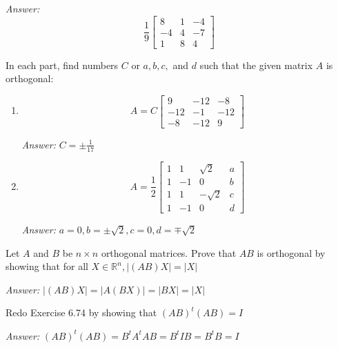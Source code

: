 \documentclass[letterpaper]{article}
\newcommand{\ans}{\textit{Answer: }}
\newenvironment{question}[2][Question]{\begin{trivlist}
\item[\hskip \labelsep {\bfseries #1}\hskip \labelsep {\bfseries #2.}]}{\end{trivlist}}
\begin{document}
\begin{question}{6.70}
\begin{enumerate}[label=(\alph*)]
    \ans 
    $$
    \frac{1}{9} \left[ \begin{array}{rrr}{8} & {1} & {-4} \\ {-4} & {4} & {-7} \\ {1} & {8} & {4}\end{array}\right]
    $$

  \end{enumerate}

\end{question}

\begin{question}{6.71}
  In each part, find numbers $C$ or $a, b, c,$ and $d$ such that the given matrix $A$ is
  orthogonal:

  \begin{enumerate}
    \item 
    $$
    A=C \left[ \begin{array}{ccc}{9} & {-12} & {-8} \\ {-12} & {-1} & {-12} \\ {-8} & {-12} & {9}\end{array}\right]
    $$

    \ans $C = \pm \frac{1}{17}$

    \item
    $$
    A=\frac{1}{2} \left[ \begin{array}{rrrr}{1} & {1} & {\sqrt{2}} & {a} \\ {1} & {-1} & {0} & {b} \\ {1} & {1} & {-\sqrt{2}} & {c} \\ {1} & {-1} & {0} & {d}\end{array}\right]
    $$

    \ans $a = 0, b = \pm \sqrt{2}, c = 0, d = \mp \sqrt{2}$ 
  \end{enumerate}  

\end{question}

\begin{question}{6.74}
  Let $A$ and $B$ be $n \times n$ orthogonal matrices. Prove that $A B$ is orthogonal by
  showing that for all $X \in \mathbb{R}^{n},|(A B) X|=|X|$

  \ans $|(A B) X| = |A (B X)| = |B X| = |X|$
\end{question}

\begin{question}{6.75}
  Redo Exercise 6.74 by showing that $(A B)^{t}(A B)=I$

  \ans $(A B)^{t}(A B) = B^tA^tAB = B^tIB = B^tB = I$
\end{question}
\end{document}
